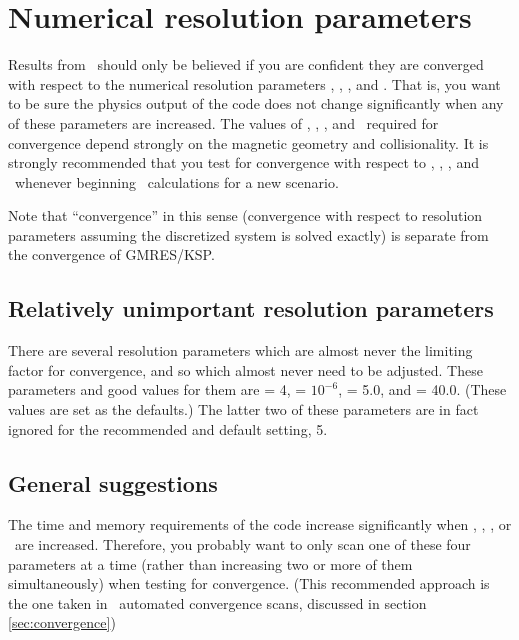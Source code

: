 \chapter{Numerical resolution parameters}
\label{ch:resolution}

Results from \sfincs~should only be believed if you are confident they
are converged with respect to the numerical resolution parameters
\Ntheta, \Nzeta, \Nxi, and \Nx.  That is, you want to be sure the
physics output of the code does not change significantly when any of
these parameters are increased. The values of \Ntheta, \Nzeta, \Nxi,
and \Nx~required for convergence depend strongly on the magnetic
geometry and collisionality. It is strongly recommended that you test for
convergence with respect to \Ntheta, \Nzeta, \Nxi, and \Nx~whenever
beginning \sfincs~calculations for a new scenario.

Note that ``convergence'' in this sense (convergence with respect to resolution parameters assuming the discretized
system is solved exactly) is separate from the convergence of GMRES/KSP.

\section{Relatively unimportant resolution parameters}

There are several resolution parameters which are almost never the limiting factor
for convergence, and so which almost never need to be adjusted.
These parameters and good values for them are \NL = 4, 
 = $10^{-6}$,
 = 5.0,
and  = 40.0.  
(These values are set as the defaults.)
The latter two of these parameters are in fact ignored
for the recommended and default  setting, 5.

\section{General suggestions}

The time and memory requirements of the code increase significantly
when \Ntheta, \Nzeta, \Nxi, or \Nx~are increased. Therefore, you
probably want to only scan one of these four parameters at a time
(rather than increasing two or more of them simultaneously) when
testing for convergence. (This recommended approach is the one taken
in \sfincsScan~automated convergence scans, discussed in section
\ref{sec:convergence})

